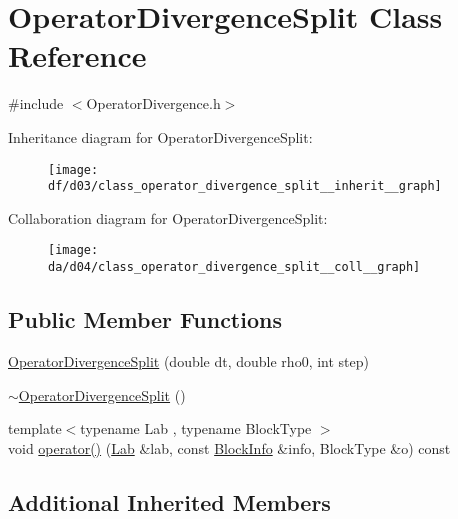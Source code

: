 \hypertarget{class_operator_divergence_split}{}\section{Operator\+Divergence\+Split Class Reference}
\label{class_operator_divergence_split}


{\ttfamily \#include $<$Operator\+Divergence.\+h$>$}



Inheritance diagram for Operator\+Divergence\+Split\+:\nopagebreak
\begin{figure}[H]
\begin{center}
\leavevmode
\texttt{[image: df/d03/class\_operator\_divergence\_split\_\_inherit\_\_graph]}
\end{center}
\end{figure}


Collaboration diagram for Operator\+Divergence\+Split\+:\nopagebreak
\begin{figure}[H]
\begin{center}
\leavevmode
\texttt{[image: da/d04/class\_operator\_divergence\_split\_\_coll\_\_graph]}
\end{center}
\end{figure}
\subsection*{Public Member Functions}
\begin{DoxyCompactItemize}
\item 
\hyperlink{class_operator_divergence_split_a1e587e11e410c9a9d12b591f94149c72}{Operator\+Divergence\+Split} (double dt, double rho0, int step)
\item 
\hyperlink{class_operator_divergence_split_aef8591e337b33be83bdc01745cb0cb07}{$\sim$\+Operator\+Divergence\+Split} ()
\item 
{\footnotesize template$<$typename Lab , typename Block\+Type $>$ }\\void \hyperlink{class_operator_divergence_split_a256c5da74a074e563b36bb2a62b2c2f9}{operator()} (\hyperlink{_definitions_8h_ae720d9054713370bbf4c86860e4dde70}{Lab} \&lab, const \hyperlink{struct_block_info}{Block\+Info} \&info, Block\+Type \&o) const 
\end{DoxyCompactItemize}
\subsection*{Additional Inherited Members}


